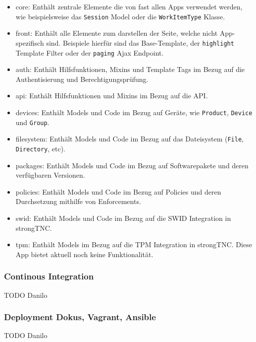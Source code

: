 \begin{itemize}
	\item core: Enthält zentrale Elemente die von fast allen Apps verwendet
		werden, wie beispielsweise das \texttt{Session} Model oder die
		\texttt{WorkItemType} Klasse.
	\item front: Enthält alle Elemente zum darstellen der Seite, welche nicht
		App-spezifisch sind. Beispiele hierfür sind das Base-Template, der
		\texttt{highlight} Template Filter oder der \texttt{paging} Ajax Endpoint.
	\item auth: Enthält Hilfsfunktionen, Mixins und Template Tags im Bezug auf die
		Authentisierung und Berechtigungsprüfung.
	\item api: Enthält Hilfsfunktionen und Mixins im Bezug auf die API.
	\item devices: Enthält Models und Code im Bezug auf Geräte, wie
		\texttt{Product}, \texttt{Device} und \texttt{Group}.
	\item filesystem: Enthält Models und Code im Bezug auf das Dateisystem
		(\texttt{File}, \texttt{Directory}, etc).
	\item packages: Enthält Models und Code im Bezug auf Softwarepakete und deren
		verfügbaren Versionen.
	\item policies: Enthält Models und Code im Bezug auf Policies und deren
		Durchsetzung mithilfe von Enforcements.
	\item swid: Enthält Models und Code im Bezug auf die SWID Integration in
		strongTNC.
	\item tpm: Enthält Models im Bezug auf die TPM Integration in
		strongTNC. Diese App bietet aktuell noch keine Funktionalität.
\end{itemize}

\subsubsection{Continous Integration}

TODO Danilo

\subsubsection{Deployment Dokus, Vagrant, Ansible}

TODO Danilo


